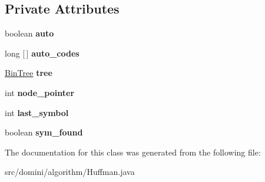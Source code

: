 \subsection*{Private Attributes}
\begin{DoxyCompactItemize}
\item 
\mbox{\label{classdomini_1_1algorithm_1_1Huffman_a1c2b6800e0b472c65f44ff9cf28a5b35}} 
boolean {\bfseries auto}
\item 
\mbox{\label{classdomini_1_1algorithm_1_1Huffman_a0fa542dd4e914d8c0da5c070fe9f682f}} 
long \mbox{[}$\,$\mbox{]} {\bfseries auto\+\_\+codes}
\item 
\mbox{\label{classdomini_1_1algorithm_1_1Huffman_a6c010fa777f5601b7be908f8c876cf8e}} 
\hyperlink{classdomini_1_1utils_1_1BinTree}{Bin\+Tree} {\bfseries tree}
\item 
\mbox{\label{classdomini_1_1algorithm_1_1Huffman_a71e35eb22265910f918572b34eaa6b2f}} 
int {\bfseries node\+\_\+pointer}
\item 
\mbox{\label{classdomini_1_1algorithm_1_1Huffman_a0da0a4274a58653bbe3e1c753adfbe38}} 
int {\bfseries last\+\_\+symbol}
\item 
\mbox{\label{classdomini_1_1algorithm_1_1Huffman_a3453c53e74badc739d51208d35ba372d}} 
boolean {\bfseries sym\+\_\+found}
\end{DoxyCompactItemize}


The documentation for this class was generated from the following file\+:\begin{DoxyCompactItemize}
\item 
src/domini/algorithm/Huffman.\+java\end{DoxyCompactItemize}
